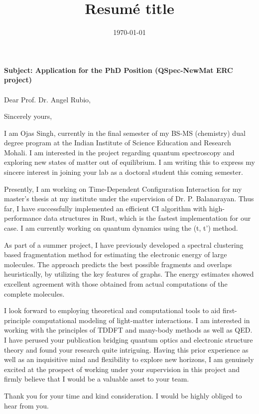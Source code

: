 \documentclass[11pt,a4paper,roman]{moderncv}        %
\title{Resumé title}                               %
\begin{document}
\date{\today}

\opening{\textbf{\small Subject: Application for the PhD Position (QSpec-NewMat ERC project)} \\   \vspace{0.5cm} \\ Dear Prof. Dr. Angel Rubio,}
\closing{Sincerely yours,}
\makelettertitle


I am Ojas Singh, currently in the final semester of my BS-MS (chemistry) dual degree program
at the Indian Institute of Science Education and Research Mohali. I am interested in the
project regarding quantum spectroscopy and exploring new states of matter out of equilibrium. I am writing this to express my sincere interest in joining your lab as a doctoral student this coming semester.

Presently, I am working on Time-Dependent Configuration Interaction for my master’s thesis at
my institute under the supervision of Dr. P. Balanarayan. Thus far, I have successfully
implemented an efficient CI algorithm with high-performance data structures in Rust, which is
the fastest implementation for our case. I am currently working on quantum dynamics using
the (t, t’) method.

As part of a summer project, I have previously developed a spectral clustering based fragmentation method for estimating the electronic energy of large molecules. The approach predicts the best possible fragments and overlaps heuristically, by utilizing the key features of graphs. The energy estimates showed excellent agreement with those obtained from actual computations of the complete molecules.

I look forward to employing theoretical and computational tools to aid first-principle computational modeling of light-matter interactions. I am interested in working with the principles of TDDFT and many-body methods as well as QED. I have perused your publication bridging quantum optics and electronic structure theory and found your research quite intriguing. Having this prior experience as well as an inquisitive mind and flexibility to explore new horizons, I am genuinely excited at the prospect of working under your supervision in this project and firmly believe that I would be a valuable asset to your team.

Thank you for your time and kind consideration. I would be highly obliged to hear from you.


\vspace{0.5cm}


\makeletterclosing
\end{document}
